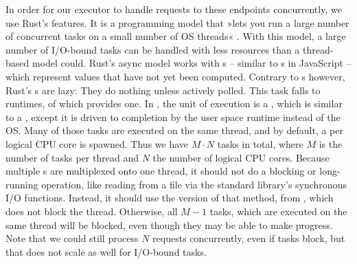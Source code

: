 

In order for our executor to handle requests to these endpoints concurrently, we use Rust's  features. It is a programming model that »lets you run a large number of concurrent tasks on a small number of OS threads« \cite{AsyncBook2021}. With this model, a large number of I/O-bound tasks can be handled with less resources than a thread-based model could.
Rust's async model works with s -- similar to s in JavaScript -- which represent values that have not yet been computed. Contrary to s however, Rust's s are lazy: They do nothing unless actively polled. This task falls to  runtimes, of which  provides one. In , the unit of execution is a , which is similar to a , except it is driven to completion by the user space runtime instead of the OS. Many of those tasks are executed on the same thread, and by default, a  per logical CPU core is spawned. Thus we have $M \cdot N$ tasks in total, where $M$ is the number of tasks per thread and $N$ the number of logical CPU cores. Because multiple s are multiplexed onto one thread, it should not do a blocking or long-running operation, like reading from a file via the standard library's synchronous I/O functions. Instead, it should use the  version of that method, from , which does not block the thread. Otherwise, all $M - 1$ tasks, which are executed on the same thread will be blocked, even though they may be able to make progress. Note that we could still process $N$ requests concurrently, even if tasks block, but that does not scale as well for I/O-bound tasks.

